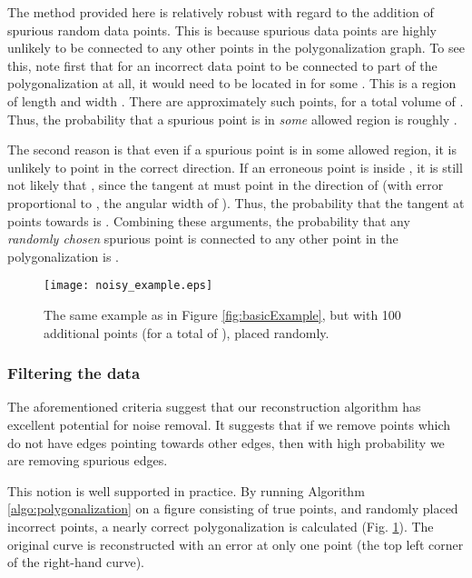 \documentclass{article}
\numberwithin{cntr}{section}
\numberwithin{equation}{section}
\begin{document}
The method provided here is relatively robust with regard to the
addition of spurious random data points. This is because spurious data
points are highly unlikely to be connected to any other points in the
polygonalization graph. To see this, note
first that for an incorrect data point to be connected to part of the
polygonalization at all, it would need to be located in
 for some .
This is a region of length  and width .
There are approximately 
such points, for a total volume of . Thus, the probability
that a spurious point is in \emph{some} allowed region is roughly
.

The second reason is that even if a spurious point is in some allowed region,
it is unlikely to point in the correct direction.
If an erroneous point  is inside , it is
still not likely that , since
the tangent at  must point in the direction of 
(with error proportional to , the angular width of
). Thus, the probability that the tangent at
 points towards  is .
Combining these arguments, the probability that any \emph{randomly chosen}
spurious point  is connected to any other point in the
polygonalization is .

\begin{figure}
\setlength{\unitlength}{0.240900pt}
\ifx\plotpoint\undefined\newsavebox{\plotpoint}\fi
\sbox{\plotpoint}{\rule[-0.200pt]{0.400pt}{0.400pt}}\texttt{[image: noisy\_example.eps]}
\caption{The same example as in Figure \ref{fig:basicExample}, but with
100 additional points (for a total of ), placed randomly. }
\label{fig:noisyExample}
\end{figure}

\subsubsection{Filtering the data}

The aforementioned criteria suggest that our reconstruction algorithm
has excellent potential for noise removal. It suggests that if we
remove points which do not have edges pointing towards other edges,
then with high probability we are removing spurious edges.

This notion is well supported in practice.
By running Algorithm \ref{algo:polygonalization} on a figure consisting of
 true points, and  randomly placed incorrect points, a nearly
correct polygonalization is calculated (Fig. \ref{fig:noisyExample}).
The original curve is reconstructed with an error at only one point
(the top left corner of the right-hand curve).
\end{document}

